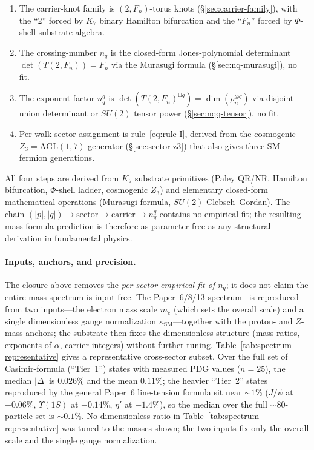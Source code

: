 \documentclass[11pt]{article}
\begin{document}
\begin{enumerate}
\item The carrier-knot family is $(2, F_n)$-torus knots (\S\ref{sec:carrier-family}), with the ``2'' forced by $K_7$ binary Hamilton bifurcation and the ``$F_n$'' forced by $\Phi$-shell substrate algebra.
\item The crossing-number $n_q$ is the closed-form Jones-polynomial determinant $\det(T(2, F_n)) = F_n$ via the Murasugi formula (\S\ref{sec:nq-murasugi}), no fit.
\item The exponent factor $n_q^q$ is $\det(T(2, F_n)^{\sqcup q}) = \dim(\rho_n^{\otimes q})$ via disjoint-union determinant or $SU(2)$ tensor power (\S\ref{sec:nqq-tensor}), no fit.
\item Per-walk sector assignment is rule~\eqref{eq:rule-I}, derived from the cosmogenic $Z_3 = \mathrm{AGL}(1, 7)$ generator (\S\ref{sec:sector-z3}) that also gives three SM fermion generations.
\end{enumerate}

All four steps are derived from $K_7$ substrate primitives (Paley QR/NR, Hamilton bifurcation, $\Phi$-shell ladder, cosmogenic $Z_3$) and elementary closed-form mathematical operations (Murasugi formula, $SU(2)$ Clebsch--Gordan).  The chain $(|p|, |q|) \to \mathrm{sector} \to \mathrm{carrier} \to n_q^q$ contains no empirical fit; the resulting mass-formula prediction is therefore as parameter-free as any structural derivation in fundamental physics.

\paragraph{Inputs, anchors, and precision.}  The closure above removes the \emph{per-sector empirical fit of $n_q$}; it does not claim the entire mass spectrum is input-free.  The Paper~6/8/13 spectrum~\cite{Paper6,Paper8,Paper13} is reproduced from two inputs---the electron mass scale $m_e$ (which sets the overall scale) and a single dimensionless gauge normalization $\kappa_\text{SM}$---together with the proton- and $Z$-mass anchors; the substrate then fixes the dimensionless structure (mass ratios, exponents of $\alpha$, carrier integers) without further tuning.  Table~\ref{tab:spectrum-representative} gives a representative cross-sector subset.  Over the full set of Casimir-formula (``Tier~1'') states with measured PDG values ($n = 25$), the median $|\Delta|$ is $0.026\%$ and the mean $0.11\%$; the heavier ``Tier~2'' states reproduced by the general Paper~6 line-tension formula sit near $\sim 1\%$ ($J/\psi$ at $+0.06\%$, $\Upsilon(1S)$ at $-0.14\%$, $\eta'$ at $-1.4\%$), so the median over the full $\sim 80$-particle set is $\sim 0.1\%$.  No dimensionless ratio in Table~\ref{tab:spectrum-representative} was tuned to the masses shown; the two inputs fix only the overall scale and the single gauge normalization.
\end{document}

